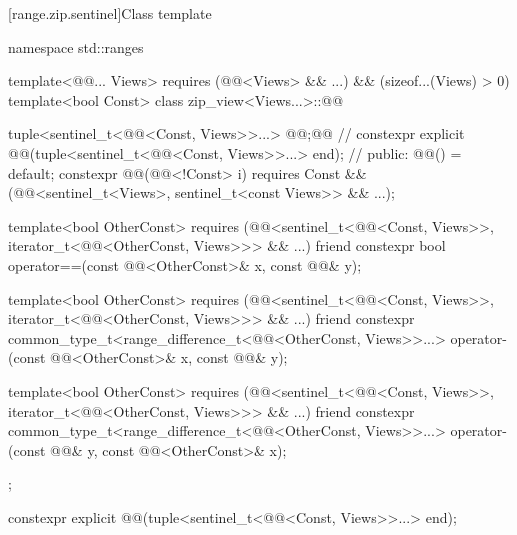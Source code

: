 [range.zip.sentinel]{Class template }

%
\begin{codeblock}
namespace std::ranges {
  template<@@... Views>
    requires (@@<Views> && ...) && (sizeof...(Views) > 0)
  template<bool Const>
  class zip_view<Views...>::@@ {
    tuple<sentinel_t<@@<Const, Views>>...> @@;@\itcorr[-1]@               // \expos
    constexpr explicit @@(tuple<sentinel_t<@@<Const, Views>>...> end);
                                                                                // \expos
  public:
    @@() = default;
    constexpr @@(@@<!Const> i)
      requires Const && (@@<sentinel_t<Views>, sentinel_t<const Views>> && ...);

    template<bool OtherConst>
      requires (@@<sentinel_t<@@<Const, Views>>,
                             iterator_t<@@<OtherConst, Views>>> && ...)
    friend constexpr bool operator==(const @@<OtherConst>& x, const @@& y);

    template<bool OtherConst>
      requires (@@<sentinel_t<@@<Const, Views>>,
                                   iterator_t<@@<OtherConst, Views>>> && ...)
    friend constexpr common_type_t<range_difference_t<@@<OtherConst, Views>>...>
      operator-(const @@<OtherConst>& x, const @@& y);

    template<bool OtherConst>
      requires (@@<sentinel_t<@@<Const, Views>>,
                                   iterator_t<@@<OtherConst, Views>>> && ...)
    friend constexpr common_type_t<range_difference_t<@@<OtherConst, Views>>...>
      operator-(const @@& y, const @@<OtherConst>& x);
  };
}
\end{codeblock}

%
\begin{itemdecl}
constexpr explicit @@(tuple<sentinel_t<@@<Const, Views>>...> end);
\end{itemdecl}

